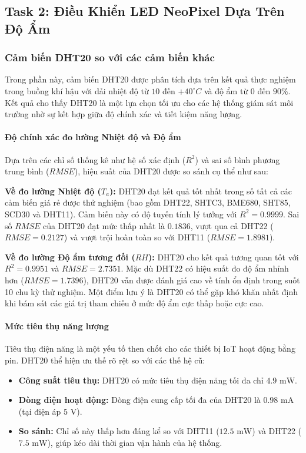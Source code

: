 \subsection{Task 2: Điều Khiển LED NeoPixel Dựa Trên Độ Ẩm}

\subsubsection{Cảm biến DHT20 so với các cảm biến khác}

Trong phần này, cảm biến DHT20 được phân tích dựa trên kết quả thực nghiệm trong buồng khí hậu với dải nhiệt độ từ $10$ đến $+40^{\circ}C$ và độ ẩm từ $0$ đến $90\%$. Kết quả cho thấy DHT20 là một lựa chọn tối ưu cho các hệ thống giám sát môi trường nhờ sự kết hợp giữa độ chính xác và tiết kiệm năng lượng.

\paragraph{Độ chính xác đo lường Nhiệt độ và Độ ẩm}

Dựa trên các chỉ số thống kê như hệ số xác định ($R^2$) và sai số bình phương trung bình ($RMSE$), hiệu suất của DHT20 được so sánh cụ thể như sau:

\textbf{Về đo lường Nhiệt độ ($T_a$):}
DHT20 đạt kết quả tốt nhất trong số tất cả các cảm biến giá rẻ được thử nghiệm (bao gồm DHT22, SHTC3, BME680, SHT85, SCD30 và DHT11). Cảm biến này có độ tuyến tính lý tưởng với $R^2 = 0.9999$. Sai số $RMSE$ của DHT20 đạt mức thấp nhất là $0.1836$, vượt qua cả DHT22 ($RMSE = 0.2127$) và vượt trội hoàn toàn so với DHT11 ($RMSE = 1.8981$).

\textbf{Về đo lường Độ ẩm tương đối ($RH$):}
DHT20 cho kết quả tương quan tốt với $R^2 = 0.9951$ và $RMSE = 2.7351$. Mặc dù DHT22 có hiệu suất đo độ ẩm nhỉnh hơn ($RMSE = 1.7396$), DHT20 vẫn được đánh giá cao về tính ổn định trong suốt 10 chu kỳ thử nghiệm. Một điểm lưu ý là DHT20 có thể gặp khó khăn nhất định khi bám sát các giá trị tham chiếu ở mức độ ẩm cực thấp hoặc cực cao.

\paragraph{Mức tiêu thụ năng lượng}

Tiêu thụ điện năng là một yếu tố then chốt cho các thiết bị IoT hoạt động bằng pin. DHT20 thể hiện ưu thế rõ rệt so với các thế hệ cũ:

\begin{itemize}
    \item \textbf{Công suất tiêu thụ:} DHT20 có mức tiêu thụ điện năng tối đa chỉ $4.9\text{ mW}$.
    \item \textbf{Dòng điện hoạt động:} Dòng điện cung cấp tối đa của DHT20 là $0.98\text{ mA}$ (tại điện áp $5\text{ V}$).
    \item \textbf{So sánh:} Chỉ số này thấp hơn đáng kể so với DHT11 ($12.5\text{ mW}$) và DHT22 ($7.5\text{ mW}$), giúp kéo dài thời gian vận hành của hệ thống.
\end{itemize}

